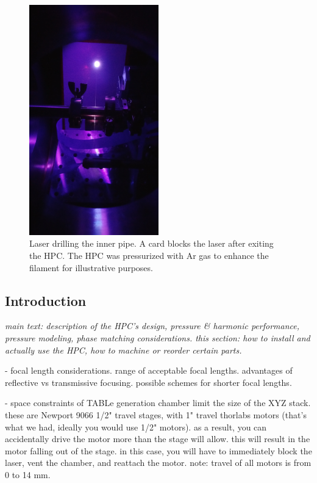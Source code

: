\begin{figure}
	\centering
	\includegraphics[angle=270, width=0.5\textwidth]{figures/app1/HPC_drilling.jpg}
	\caption{Laser drilling the inner pipe. A card blocks the laser after exiting the HPC. The HPC was pressurized with Ar gas to enhance the filament for illustrative purposes.}
	\label{fig:HPC_drilling}
\end{figure}

\subsection{Introduction}
\textit{main text: description of the HPC's design, pressure \& harmonic performance, pressure modeling, phase matching considerations. this section: how to install and actually use the HPC, how to machine or reorder certain parts.}

- focal length considerations. range of acceptable focal lengths. advantages of reflective vs transmissive focusing. possible schemes for shorter focal lengths. 

- space constraints of TABLe generation chamber limit the size of the XYZ stack. these are Newport 9066 1/2" travel stages, with 1" travel thorlabs motors (that's what we had, ideally you would use 1/2" motors). as a result, you can accidentally drive the motor more than the stage will allow. this will result in the motor falling out of the stage. in this case, you will have to immediately block the laser, vent the chamber, and reattach the motor. note: travel of all motors is from 0 to 14 mm.


